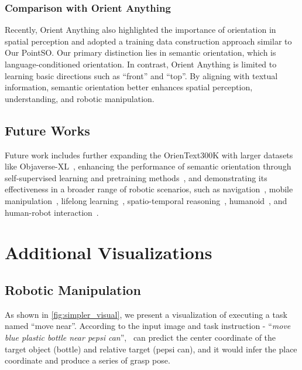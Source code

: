 \subsubsection{Comparison with Orient Anything~\cite{orient_anything24}}
Recently, Orient Anything also highlighted the importance of orientation in spatial perception and adopted a training data construction approach similar to Our PointSO. Our primary distinction lies in semantic orientation, which is language-conditioned orientation. In contrast, Orient Anything is limited to learning basic directions such as ``front'' and ``top''. By aligning with textual information, semantic orientation better enhances spatial perception, understanding, and robotic manipulation.

\subsection{Future Works}
Future work includes further expanding the OrienText300K with larger datasets like Objaverse-XL~\cite{ObjaverseXL23}, enhancing the performance of semantic orientation through self-supervised learning and pretraining methods~\cite{MAE,CLIP,ACT23,ReCon23}, and demonstrating its effectiveness in a broader range of robotic scenarios, such as navigation~\cite{GOAT24}, mobile manipulation~\cite{homerobot23}, lifelong learning~\cite{LIBERO23}, spatio-temporal reasoning~\cite{ReKep24,LeaFLF23,CrossVideoSC24,thinking24}, humanoid~\cite{OmniH2O24,SmoothHumanoidLCP24,Exbody24,humanup25}, and human-robot interaction~\cite{HOI4D22,InteractiveHO23}.



\section{Additional Visualizations}\label{app:visualization}

\subsection{Robotic Manipulation}
As shown in \cref{fig:simpler_visual}, we present a visualization of executing a task named ``move near''.
According to the input image and task instruction - ``\textit{move blue plastic bottle near pepsi can}'', \ours~can predict the center coordinate of the target object (bottle) and relative target (pepsi can), and it would infer the place coordinate and produce a series of grasp pose.

